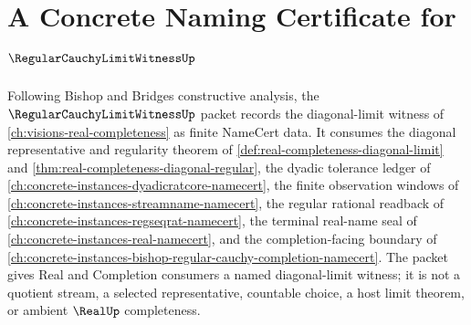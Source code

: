 \chapter{A Concrete Naming Certificate for $\RegularCauchyLimitWitnessUp$}
\label{ch:concrete-instances-regular-cauchy-limit-witness-namecert}

Following Bishop and Bridges constructive analysis, the $\RegularCauchyLimitWitnessUp$ packet records the diagonal-limit witness of \autoref{ch:visions-real-completeness} as finite NameCert data. It consumes the diagonal representative and regularity theorem of \autoref{def:real-completeness-diagonal-limit} and \autoref{thm:real-completeness-diagonal-regular}, the dyadic tolerance ledger of \autoref{ch:concrete-instances-dyadicratcore-namecert}, the finite observation windows of \autoref{ch:concrete-instances-streamname-namecert}, the regular rational readback of \autoref{ch:concrete-instances-regseqrat-namecert}, the terminal real-name seal of \autoref{ch:concrete-instances-real-namecert}, and the completion-facing boundary of \autoref{ch:concrete-instances-bishop-regular-cauchy-completion-namecert}. The packet gives Real and Completion consumers a named diagonal-limit witness; it is not a quotient stream, a selected representative, countable choice, a host limit theorem, or ambient $\RealUp$ completeness.

